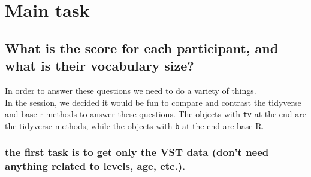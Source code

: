 \documentclass[
]{article}
\newenvironment{Shaded}{\begin{snugshade}}{\end{snugshade}}
\newcommand{\CommentTok}[1]{\textcolor[rgb]{0.56,0.35,0.01}{\textit{#1}}}
\newcommand{\DataTypeTok}[1]{\textcolor[rgb]{0.13,0.29,0.53}{#1}}
\newcommand{\KeywordTok}[1]{\textcolor[rgb]{0.13,0.29,0.53}{\textbf{#1}}}
\newcommand{\NormalTok}[1]{#1}
\newcommand{\OperatorTok}[1]{\textcolor[rgb]{0.81,0.36,0.00}{\textbf{#1}}}
\newcommand{\StringTok}[1]{\textcolor[rgb]{0.31,0.60,0.02}{#1}}
\begin{document}
\hypertarget{main-task}{%
\section{Main task}\label{main-task}}

\hypertarget{what-is-the-score-for-each-participant-and-what-is-their-vocabulary-size}{%
\subsection{\texorpdfstring{What is the score for each participant, and
what is their vocabulary size?\\
}{What is the score for each participant, and what is their vocabulary size? }}\label{what-is-the-score-for-each-participant-and-what-is-their-vocabulary-size}}

In order to answer these questions we need to do a variety of things.\\

In the session, we decided it would be fun to compare and contrast the
tidyverse and base r methods to answer these questions. The objects with
\texttt{tv} at the end are the tidyverse methods, while the objects with
\texttt{b} at the end are base R.

\hypertarget{the-first-task-is-to-get-only-the-vst-data-dont-need-anything-related-to-levels-age-etc..}{%
\subsubsection{the first task is to get only the VST data (don't need
anything related to levels, age,
etc.).}\label{the-first-task-is-to-get-only-the-vst-data-dont-need-anything-related-to-levels-age-etc..}}

\begin{Shaded}
\end{Shaded}
\end{document}

